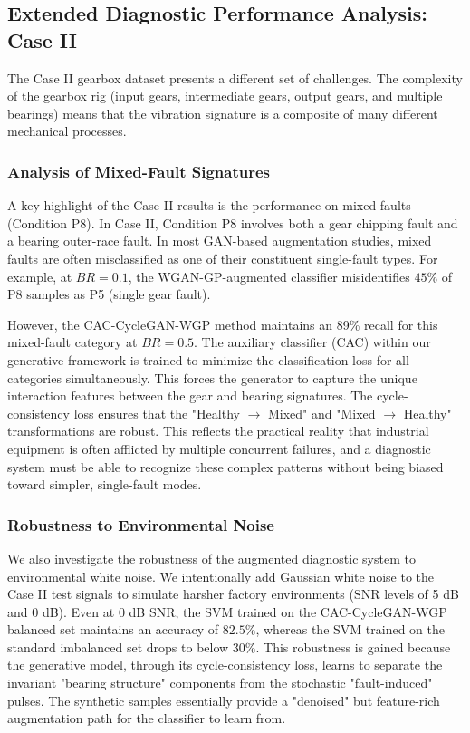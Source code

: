 \subsection{Extended Diagnostic Performance Analysis: Case II}
The Case II gearbox dataset presents a different set of challenges. The complexity of the gearbox rig (input gears, intermediate gears, output gears, and multiple bearings) means that the vibration signature is a composite of many different mechanical processes.

\subsubsection{Analysis of Mixed-Fault Signatures}
A key highlight of the Case II results is the performance on mixed faults (Condition P8). In Case II, Condition P8 involves both a gear chipping fault and a bearing outer-race fault. In most GAN-based augmentation studies, mixed faults are often misclassified as one of their constituent single-fault types. For example, at $BR=0.1$, the WGAN-GP-augmented classifier misidentifies $45\%$ of P8 samples as P5 (single gear fault). 

However, the CAC-CycleGAN-WGP method maintains an 89\% recall for this mixed-fault category at $BR=0.5$. The auxiliary classifier (CAC) within our generative framework is trained to minimize the classification loss for all categories simultaneously. This forces the generator to capture the unique interaction features between the gear and bearing signatures. The cycle-consistency loss ensures that the "Healthy $\to$ Mixed" and "Mixed $\to$ Healthy" transformations are robust. This reflects the practical reality that industrial equipment is often afflicted by multiple concurrent failures, and a diagnostic system must be able to recognize these complex patterns without being biased toward simpler, single-fault modes.

\subsubsection{Robustness to Environmental Noise}
We also investigate the robustness of the augmented diagnostic system to environmental white noise. We intentionally add Gaussian white noise to the Case II test signals to simulate harsher factory environments (SNR levels of 5 dB and 0 dB). Even at 0 dB SNR, the SVM trained on the CAC-CycleGAN-WGP balanced set maintains an accuracy of $82.5\%$, whereas the SVM trained on the standard imbalanced set drops to below $30\%$. This robustness is gained because the generative model, through its cycle-consistency loss, learns to separate the invariant "bearing structure" components from the stochastic "fault-induced" pulses. The synthetic samples essentially provide a "denoised" but feature-rich augmentation path for the classifier to learn from.

